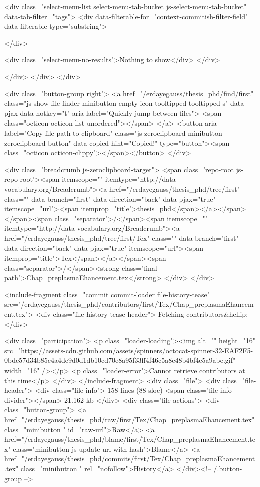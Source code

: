       <div class="select-menu-list select-menu-tab-bucket js-select-menu-tab-bucket" data-tab-filter="tags">
        <div data-filterable-for="context-commitish-filter-field" data-filterable-type="substring">


        </div>

        <div class="select-menu-no-results">Nothing to show</div>
      </div>

    </div>
  </div>
</div>

  <div class="button-group right">
    <a href="/erdayegauss/thesis_phd/find/first"
          class="js-show-file-finder minibutton empty-icon tooltipped tooltipped-s"
          data-pjax
          data-hotkey="t"
          aria-label="Quickly jump between files">
      <span class="octicon octicon-list-unordered"></span>
    </a>
    <button aria-label="Copy file path to clipboard" class="js-zeroclipboard minibutton zeroclipboard-button" data-copied-hint="Copied!" type="button"><span class="octicon octicon-clippy"></span></button>
  </div>

  <div class="breadcrumb js-zeroclipboard-target">
    <span class='repo-root js-repo-root'><span itemscope="" itemtype="http://data-vocabulary.org/Breadcrumb"><a href="/erdayegauss/thesis_phd/tree/first" class="" data-branch="first" data-direction="back" data-pjax="true" itemscope="url"><span itemprop="title">thesis_phd</span></a></span></span><span class="separator">/</span><span itemscope="" itemtype="http://data-vocabulary.org/Breadcrumb"><a href="/erdayegauss/thesis_phd/tree/first/Tex" class="" data-branch="first" data-direction="back" data-pjax="true" itemscope="url"><span itemprop="title">Tex</span></a></span><span class="separator">/</span><strong class="final-path">Chap_preplasmaEhancement.tex</strong>
  </div>
</div>

<include-fragment class="commit commit-loader file-history-tease" src="/erdayegauss/thesis_phd/contributors/first/Tex/Chap_preplasmaEhancement.tex">
  <div class="file-history-tease-header">
    Fetching contributors&hellip;
  </div>

  <div class="participation">
    <p class="loader-loading"><img alt="" height="16" src="https://assets-cdn.github.com/assets/spinners/octocat-spinner-32-EAF2F5-0bdc57d34b85c4a4de9d0d1db10cd70e8a95f33ff4f46c5a8c48b4bf4e5a9abe.gif" width="16" /></p>
    <p class="loader-error">Cannot retrieve contributors at this time</p>
  </div>
</include-fragment>
<div class="file">
  <div class="file-header">
    <div class="file-info">
        158 lines (88 sloc)
        <span class="file-info-divider"></span>
      21.162 kb
    </div>
    <div class="file-actions">
      <div class="button-group">
        <a href="/erdayegauss/thesis_phd/raw/first/Tex/Chap_preplasmaEhancement.tex" class="minibutton " id="raw-url">Raw</a>
          <a href="/erdayegauss/thesis_phd/blame/first/Tex/Chap_preplasmaEhancement.tex" class="minibutton js-update-url-with-hash">Blame</a>
        <a href="/erdayegauss/thesis_phd/commits/first/Tex/Chap_preplasmaEhancement.tex" class="minibutton " rel="nofollow">History</a>
      </div><!-- /.button-group -->



